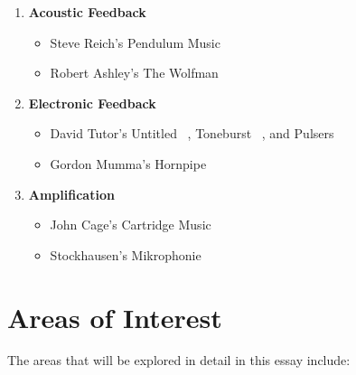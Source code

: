 \documentclass{scrartcl}
\begin{document}
    \begin{enumerate}
        \item \textbf{Acoustic Feedback}
            \begin{itemize}
                \item Steve Reich's Pendulum Music~\parencite[p.31]{reich2002wom}
                \item Robert Ashley's The Wolfman~\citeyearpar{ashley2003w}
            \end{itemize}

        \item \textbf{Electronic Feedback}
            \begin{itemize}
                \item David Tutor's Untitled ~\citeyearpar{tudor1996twfle},
                    Toneburst ~\citeyearpar{tudor2004lem}, and
                    Pulsers ~\citeyearpar{tudor1996twfle}  
                \item Gordon Mumma's Hornpipe~\citeyearpar{mumma2002lem}
            \end{itemize}

        \item \textbf{Amplification}
            \begin{itemize}
                \item John Cage's Cartridge Music~\citeyearpar{cage2013cm}
                \item Stockhausen's
                    Mikrophonie~\citeyearpar{stockhausen1995mmt}
            \end{itemize}
    \end{enumerate}

    \section{Areas of Interest}
    The areas that will be explored in detail in this essay include:
\end{document}
